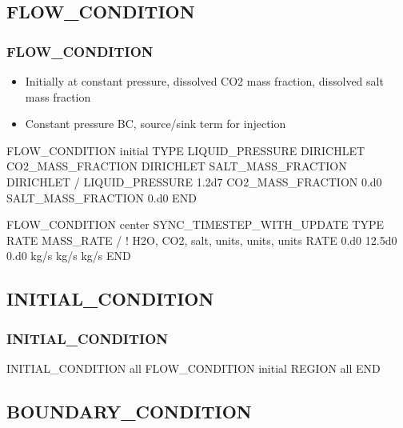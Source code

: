 \documentclass{beamer}
\newcommand\bluecomment[1]{{{\color{blue} #1}}}
\begin{document}
\subsection{FLOW\_CONDITION}

\begin{frame}\frametitle{FLOW\_CONDITION}

\begin{itemize}
\item Initially at constant pressure, dissolved CO2 mass fraction, dissolved salt mass fraction
\item Constant pressure BC, source/sink term for injection
\end{itemize}

\begin{semiverbatim}
FLOW_CONDITION initial
  TYPE
    LIQUID_PRESSURE DIRICHLET
    CO2_MASS_FRACTION DIRICHLET
    SALT_MASS_FRACTION DIRICHLET
  /
  LIQUID_PRESSURE 1.2d7
  CO2_MASS_FRACTION 0.d0
  SALT_MASS_FRACTION 0.d0
END

\newpage
FLOW_CONDITION center
  SYNC_TIMESTEP_WITH_UPDATE
  TYPE
    RATE MASS_RATE
  /
  \bluecomment{   ! H2O,  CO2,  salt, units, units, units}
  RATE 0.d0 12.5d0 0.d0   kg/s   kg/s   kg/s
END

\end{semiverbatim}

\end{frame}

\subsection{INITIAL\_CONDITION}

\begin{frame}[fragile]\frametitle{INITIAL\_CONDITION}

\begin{semiverbatim}
INITIAL_CONDITION all
  FLOW_CONDITION initial
  REGION all
END
\end{semiverbatim}

\end{frame}

\subsection{BOUNDARY\_CONDITION}
\end{document}
